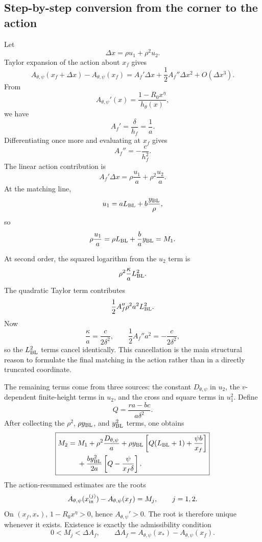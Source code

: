 \documentclass[11pt]{article}
\begin{document}
\subsection{Step-by-step conversion from the corner to the action}
Let
\[
\Delta x=\rho u_1+\rho^2u_2.
\]
Taylor expansion of the action about \(x_f\) gives
\[
A_{\theta,\psi}(x_f+\Delta x)-A_{\theta,\psi}(x_f)
=A_f'\Delta x+\frac12A_f''\Delta x^2+O(\Delta x^3).
\]
From
\[
A_{\theta,\psi}'(x)=\frac{1-R_0x^\eta}{h_\theta(x)},
\]
we have
\[
A_f'=\frac\delta{h_f}=\frac1a.
\]
Differentiating once more and evaluating at \(x_f\) gives
\[
A_f''=-\frac{c}{h_f^2}.
\]
The linear action contribution is
\[
A_f'\Delta x=\rho\frac{u_1}a+\rho^2\frac{u_2}a.
\]
At the matching line,
\[
u_1=aL_{\rm BL}+b\frac{y_{\rm BL}}\rho,
\]
so
\[
\rho\frac{u_1}a=\rho L_{\rm BL}+\frac ba y_{\rm BL}=M_1.
\]

At second order, the squared logarithm from the \(u_2\) term is
\[
\rho^2\frac\kappa aL_{\rm BL}^2.
\]
The quadratic Taylor term contributes
\[
\frac12A_f''\rho^2a^2L_{\rm BL}^2.
\]
Now
\[
\frac\kappa a=\frac{c}{2\delta^2},
\qquad
\frac12A_f''a^2=-\frac{c}{2\delta^2},
\]
so the \(L_{\rm BL}^2\) terms cancel identically. This cancellation is the main structural reason to formulate the final matching in the action rather than in a directly truncated coordinate.

The remaining terms come from three sources: the constant \(D_{\theta,\psi}\) in \(u_2\), the \(v\)-dependent finite-height terms in \(u_2\), and the cross and square terms in \(u_1^2\). Define
\[
Q=\frac{ra-bc}{a\delta^2}.
\]
After collecting the \(\rho^2\), \(\rho y_{\rm BL}\), and \(y_{\rm BL}^2\) terms, one obtains
\[
\boxed{
\begin{aligned}
M_2={}&M_1+\rho^2\frac{D_{\theta,\psi}}a
+\rho y_{\rm BL}\left[Q(L_{\rm BL}+1)+\frac{\psi b}{x_f}\right]\\
&+\frac{b y_{\rm BL}^2}{2a}
\left[Q-\frac{\psi}{x_f\delta}\right].
\end{aligned}}
\]
The action-resummed estimates are the roots
\[
A_{\theta,\psi}(x_{\rm in}^{(j)})-A_{\theta,\psi}(x_f)=M_j,
\qquad j=1,2.
\]
On \((x_f,x_*)\), \(1-R_0x^\eta>0\), hence \(A_{\theta,\psi}'>0\). The root is therefore unique whenever it exists. Existence is exactly the admissibility condition
\[
0<M_j<\Delta A_f,
\qquad
\Delta A_f=A_{\theta,\psi}(x_*)-A_{\theta,\psi}(x_f).
\]
\end{document}
